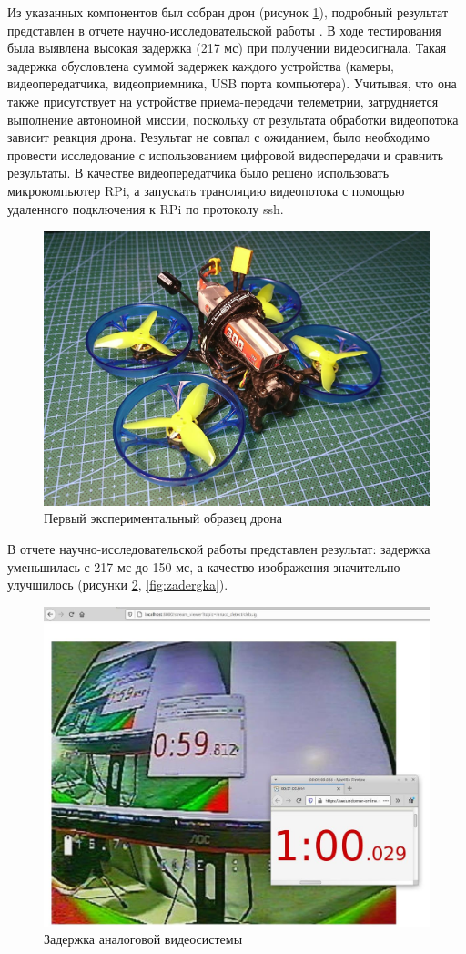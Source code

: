 Из указанных компонентов был собран дрон (рисунок \ref{fig:drone}), подробный результат представлен в отчете научно-исследовательской работы \cite{nir1}. В ходе тестирования была выявлена высокая задержка (217 мс) при получении видеосигнала. Такая задержка обусловлена суммой задержек каждого устройства (камеры, видеопередатчика, видеоприемника, USB порта компьютера). Учитывая, что она также присутствует на устройстве приема-передачи телеметрии, затрудняется выполнение автономной миссии, поскольку от результата обработки видеопотока зависит реакция дрона. Результат не совпал с ожиданием, было необходимо провести исследование с использованием цифровой видеопередачи и сравнить результаты. В качестве видеопередатчика было решено использовать микрокомпьютер RPi, а запускать трансляцию видеопотока с помощью удаленного подключения к RPi по протоколу ssh.

\begin{figure}[H]
	\centering
	\includegraphics[width=0.5\linewidth]{../RW/pics/quad2}
	\caption{Первый экспериментальный образец дрона
	}
	\label{fig:drone} %
\end{figure}

В отчете научно-исследовательской работы \cite{nir2} представлен результат: задержка уменьшилась с 217 мс до 150 мс, а качество изображения значительно улучшилось (рисунки \ref{fig:time}, \ref{fig:zadergka}).

\begin{figure}[H]
	\centering
	\includegraphics[width=0.5\linewidth]{../RW/pics/time}
	\caption{Задержка аналоговой видеосистемы
	}
	\label{fig:time} %
\end{figure}

